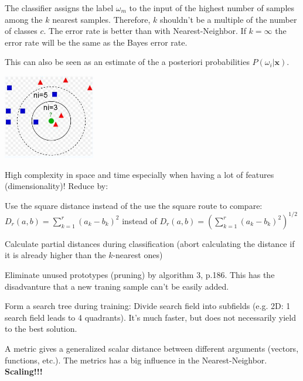   \begin{minipage}{14.5cm}
		The classifier assigns the label $\omega_m$ to the input of the highest number of samples among the $k$
		nearest samples. Therefore, $k$ shouldn't be a multiple of the number of classes $c$. 
		The error rate is better than with Nearest-Neighbor. If $k=\infty$
		the error rate will be the same as the Bayes error rate. 
		
		This can also be seen as an estimate of the a posteriori probabilities $P(\omega_i|\bm x)$.
		
  \end{minipage}
  \hfill
  \begin{minipage}{4cm}
	  	\includegraphics[width=4cm]{./images/kNearest.png}
  \end{minipage}
  
    High complexity in space and time especially when having a lot of features (dimensionality)!
    Reduce by: 
    \begin{aufzaehlung}
    	\item Use the square distance instead of the use the square route to compare: $D_r(a,b)=\sum\limits_{k=1}^r(a_k-b_k)^2$ 
    	instead of  $D_r(a,b)=\left(\sum\limits_{k=1}^r(a_k-b_k)^2\right)^{1/2}$
    	\item Calculate partial distances during classification (abort calculating the distance if it 
    	is already higher than the $k$-nearest ones)
    	\item Eliminate unused prototypes (pruning) by algorithm 3, p.186. This has the disadvanture that a new traning sample can't be easily added.
    	\item Form a search tree during training: Divide search field into subfields (e.g. 2D: 
    	1 search field leads to 4 quadrants). It's much faster, but does not necessarily yield to the best solution.
    \end{aufzaehlung}
  
    A metric gives a generalized scalar distance between different arguments (vectors, functions, etc.). 
    The metrics has  a big influence in the Nearest-Neighbor. \textbf{Scaling!!!}
  
